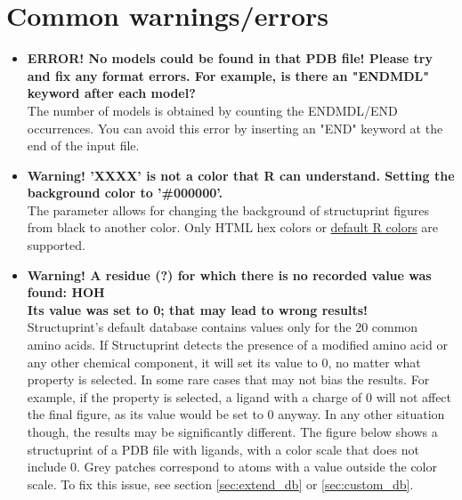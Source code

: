 \documentclass[12pt,a4paper]{article}
\begin{document}
\newpage

\section{Common warnings/errors}

\begin{itemize}

\item\textbf{ERROR! No models could be found in that PDB file! Please try and 
fix any format errors. For example, is there an "ENDMDL" keyword after each model?}\\
The number of models is obtained by counting the ENDMDL/END occurrences. You 
can avoid this error by inserting an "END" keyword at the end of the input file.

\item\textbf{Warning! 'XXXX' is not a color that R can understand. 
Setting the background color to '\#000000'.}\\
The  parameter allows for changing the background of structuprint 
figures from black to another color. Only HTML hex colors or 
\href{http://www.stat.columbia.edu/~tzheng/files/Rcolor.pdf}{default R colors} 
are supported.

\item \textbf{Warning! A residue (?) for which there is no recorded value was found: HOH\\
Its value was set to 0; that may lead to wrong results!}\\
Structuprint's default database contains values only for the 20 common amino acids. 
If Structuprint detects the presence of a modified amino acid or any other chemical 
component, it will set its value to 0, no matter what property is selected. In 
some rare cases that may not bias the results. For example, if the 
 property is selected, a ligand with a charge of 0 will not 
affect the final figure, as its value would be set to 0 anyway. In any other 
situation though, the results may be significantly different. The figure below 
shows a structuprint of a PDB file with ligands, with a color scale that 
does not include 0. Grey patches correspond to atoms with a value outside the color 
scale. To fix this issue, see section \ref{sec:extend_db} or \ref{sec:custom_db}.


\end{itemize}
\end{document}
